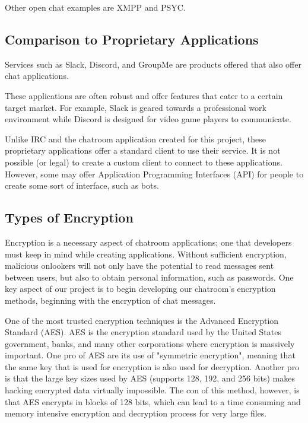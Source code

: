 \documentclass{article}
\begin{document}
Other open chat examples are XMPP and PSYC. 

\subsection{Comparison to Proprietary Applications}

Services such as Slack, Discord, and GroupMe are products offered that also offer chat applications. 

These applications are often robust and offer features that cater to a certain target market. For example, Slack is geared towards a professional work environment while Discord is designed for video game players to communicate. 

Unlike IRC and the chatroom application created for this project, these proprietary applications offer a standard client to use their service. It is not possible (or legal) to create a custom client to connect to these applications. However, some may offer Application Programming Interfaces (API) for people to create some sort of interface, such as bots. 

\subsection{Types of Encryption}

Encryption is a necessary aspect of chatroom applications; one that developers must keep in mind while creating applications. Without sufficient encryption, malicious onlookers will not only have the potential to read messages sent between users, but also to obtain personal information, such as passwords. One key aspect of our project is to begin developing our chatroom's encryption methods, beginning with the encryption of chat messages. 

One of the most trusted encryption techniques is the Advanced Encryption Standard (AES). AES is the encryption standard used by the United States government, banks, and many other corporations where encryption is massively important. One pro of AES are its use of "symmetric encryption", meaning that the same key that is used for encryption is also used for decryption. Another pro is that the large key sizes used by AES (supports 128, 192, and 256 bits) makes hacking encrypted data virtually impossible. The con of this method, however, is that AES encrypts in blocks of 128 bits, which can lead to a time consuming and memory intensive encryption and decryption process for very large files. 
\end{document}

